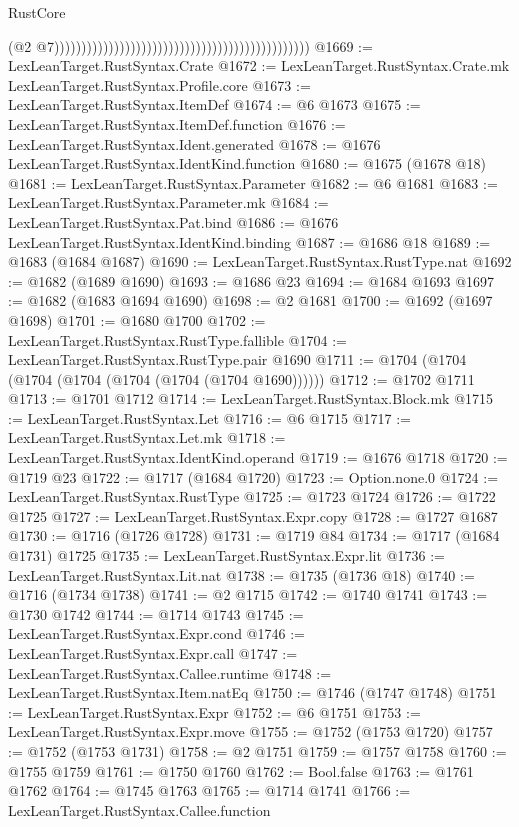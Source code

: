 \begin{lexlean}{RustCore}
\begin{coremodule}
                                                                                                (@2
                                                                                                  @7)))))))))))))))))))))))))))))))))))))))))))))))
@1669 := LexLeanTarget.RustSyntax.Crate
@1672 := LexLeanTarget.RustSyntax.Crate.mk LexLeanTarget.RustSyntax.Profile.core
@1673 := LexLeanTarget.RustSyntax.ItemDef
@1674 := @6 @1673
@1675 := LexLeanTarget.RustSyntax.ItemDef.function
@1676 := LexLeanTarget.RustSyntax.Ident.generated
@1678 := @1676 LexLeanTarget.RustSyntax.IdentKind.function
@1680 := @1675 (@1678 @18)
@1681 := LexLeanTarget.RustSyntax.Parameter
@1682 := @6 @1681
@1683 := LexLeanTarget.RustSyntax.Parameter.mk
@1684 := LexLeanTarget.RustSyntax.Pat.bind
@1686 := @1676 LexLeanTarget.RustSyntax.IdentKind.binding
@1687 := @1686 @18
@1689 := @1683 (@1684 @1687)
@1690 := LexLeanTarget.RustSyntax.RustType.nat
@1692 := @1682 (@1689 @1690)
@1693 := @1686 @23
@1694 := @1684 @1693
@1697 := @1682 (@1683 @1694 @1690)
@1698 := @2 @1681
@1700 := @1692 (@1697 @1698)
@1701 := @1680 @1700
@1702 := LexLeanTarget.RustSyntax.RustType.fallible
@1704 := LexLeanTarget.RustSyntax.RustType.pair @1690
@1711 := @1704 (@1704 (@1704 (@1704 (@1704 (@1704 (@1704 @1690))))))
@1712 := @1702 @1711
@1713 := @1701 @1712
@1714 := LexLeanTarget.RustSyntax.Block.mk
@1715 := LexLeanTarget.RustSyntax.Let
@1716 := @6 @1715
@1717 := LexLeanTarget.RustSyntax.Let.mk
@1718 := LexLeanTarget.RustSyntax.IdentKind.operand
@1719 := @1676 @1718
@1720 := @1719 @23
@1722 := @1717 (@1684 @1720)
@1723 := Option.none.{0}
@1724 := LexLeanTarget.RustSyntax.RustType
@1725 := @1723 @1724
@1726 := @1722 @1725
@1727 := LexLeanTarget.RustSyntax.Expr.copy
@1728 := @1727 @1687
@1730 := @1716 (@1726 @1728)
@1731 := @1719 @84
@1734 := @1717 (@1684 @1731) @1725
@1735 := LexLeanTarget.RustSyntax.Expr.lit
@1736 := LexLeanTarget.RustSyntax.Lit.nat
@1738 := @1735 (@1736 @18)
@1740 := @1716 (@1734 @1738)
@1741 := @2 @1715
@1742 := @1740 @1741
@1743 := @1730 @1742
@1744 := @1714 @1743
@1745 := LexLeanTarget.RustSyntax.Expr.cond
@1746 := LexLeanTarget.RustSyntax.Expr.call
@1747 := LexLeanTarget.RustSyntax.Callee.runtime
@1748 := LexLeanTarget.RustSyntax.Item.natEq
@1750 := @1746 (@1747 @1748)
@1751 := LexLeanTarget.RustSyntax.Expr
@1752 := @6 @1751
@1753 := LexLeanTarget.RustSyntax.Expr.move
@1755 := @1752 (@1753 @1720)
@1757 := @1752 (@1753 @1731)
@1758 := @2 @1751
@1759 := @1757 @1758
@1760 := @1755 @1759
@1761 := @1750 @1760
@1762 := Bool.false
@1763 := @1761 @1762
@1764 := @1745 @1763
@1765 := @1714 @1741
@1766 := LexLeanTarget.RustSyntax.Callee.function

\end{coremodule}
\end{lexlean}
